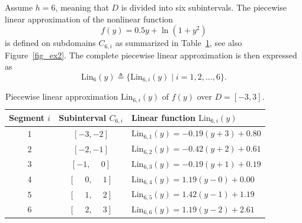 \documentclass[preprint,12pt]{elsarticle}
\begin{document}
Assume \( h = 6 \), meaning that \( D \) is divided into six subintervals.  
The piecewise linear approximation of the nonlinear function
\[
f(y) = 0.5y + \ln(1 + y^2)
\]
is defined on subdomains \( C_{6,i} \) as summarized in Table~\ref{tab:Lin6},  
see also Figure~\ref{fig_ex2}. The complete piecewise linear approximation is then expressed as  
\[
\text{Lin}_{6}(y) \triangleq \{ \text{Lin}_{6,i}(y) \mid i = 1, 2, \dots, 6 \}.
\]
\begin{table}[ht]
\centering
\caption{Piecewise linear approximation $\text{Lin}_{6,i}(y)$ of $f(y)$ over $D=[-3,3]$.}
\label{tab:Lin6}
\begin{tabular}{ccl}
\toprule
Segment $i$ & Subinterval $C_{6,i}$ & Linear function $\text{Lin}_{6,i}(y)$ \\ 
\midrule
1 & $[-3, -2]$ & $\text{Lin}_{6,1}(y) = -0.19(y + 3) + 0.80$ \\
2 & $[-2, -1]$ & $\text{Lin}_{6,2}(y) = -0.42(y + 2) + 0.61$ \\
3 & $[-1, \phantom{-}0]$ & $\text{Lin}_{6,3}(y) = -0.19(y + 1) + 0.19$ \\
4 & $[\phantom{-}0, \phantom{-}1]$ & $\text{Lin}_{6,4}(y) = 1.19(y - 0) + 0.00$ \\
5 & $[\phantom{-}1, \phantom{-}2]$ & $\text{Lin}_{6,5}(y) = 1.42(y - 1) + 1.19$ \\
6 & $[\phantom{-}2, \phantom{-}3]$ & $\text{Lin}_{6,6}(y) = 1.19(y - 2) + 2.61$ \\
\bottomrule
\end{tabular}
\end{table}
\end{document}
